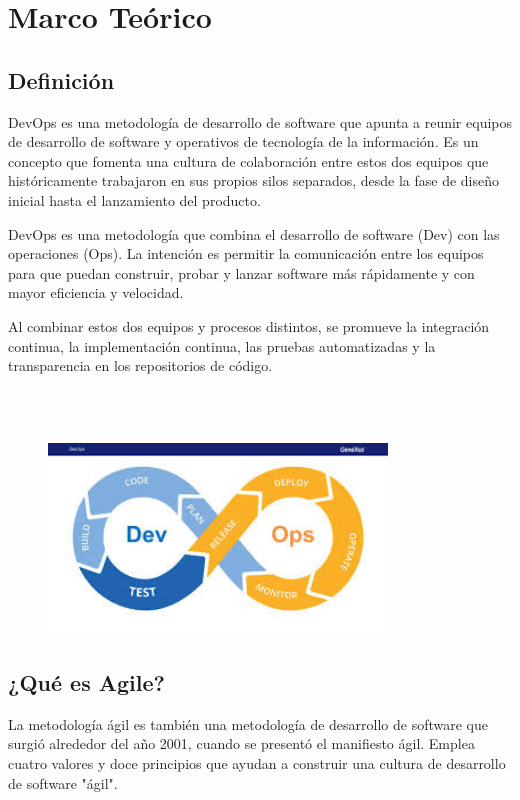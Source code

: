 \documentclass[preprint,12pt]{elsarticle}
\begin{document}
\section{Marco Teórico}

\subsection{Definición}

DevOps es una metodología de desarrollo de software que apunta a reunir equipos de desarrollo de software y operativos de tecnología de la información. Es un concepto que fomenta una cultura de colaboración entre estos dos equipos que históricamente trabajaron en sus propios silos separados, desde la fase de diseño inicial hasta el lanzamiento del producto.

DevOps es una metodología que combina el desarrollo de software (Dev) con las operaciones (Ops). La intención es permitir la comunicación entre los equipos para que puedan construir, probar y lanzar software más rápidamente y con mayor eficiencia y velocidad.

Al combinar estos dos equipos y procesos distintos, se promueve la integración continua, la implementación continua, las pruebas automatizadas y la transparencia en los repositorios de código.\cite{referenciarobles1}


\cite{DWarehouse02}
\\
\\

\begin{figure}[htb]
				\begin{center}
					\includegraphics[width=9cm]{./IMAGENES/definicionsql}
				\end{center}
			\end{figure}

\subsection{¿Qué es Agile?}
La metodología ágil es también una metodología de desarrollo de software que surgió alrededor del año 2001, cuando se presentó el manifiesto ágil. Emplea cuatro valores y doce principios que ayudan a construir una cultura de desarrollo de software "ágil".
\end{document}
